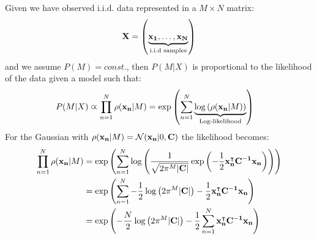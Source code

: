 Given we have observed i.i.d. data represented in a $M \times N$ matrix:
\begin{align}
	\mathbf{X} = \left( \underbrace{\mathbf{x_1}, \dots, \mathbf{x_N}}_{\text{i.i.d samples}} \right)
\end{align}
and we assume $P(M) = const.$, then $P(M|X)$ is proportional to the likelihood of the 
data given a model such that:
\begin{align}
	\begin{split}
	P(M|X) \varpropto \prod_{n=1}^N \rho(\mathbf{x_n}|M) 
	    &= \exp \left( \sum_{n=1}^N \underbrace{\log \left( \rho(\mathbf{x_n}|M) \right)}_{\text{Log-likelihood}} \right)
	\end{split}
\end{align}
\noindent For the Gaussian with $\rho(\mathbf{x_n}|M) = \mathcal{N}(\mathbf{x_n}|0,\mathbf{C})$ the likelihood becomes:
\begin{align}
	\begin{split}
	\prod_{n=1}^N \rho(\mathbf{x_n}|M) 
	        &= \exp \left( \sum_{n=1}^N \log \left( \frac{1}{\sqrt{2\pi^M |\mathbf{C}|}} \exp \left( -\frac{1}{2} \mathbf{x_n ^\intercal C^{-1} x_n} \right) \right) \right) \\
	        &= \exp \left( \sum_{n=1}^N -\frac{1}{2}\log \left( 2\pi^M |\mathbf{C}| \right) -\frac{1}{2} \mathbf{x_n ^\intercal C^{-1} x_n} \right) \\
	        &= \exp \left( -\frac{N}{2}\log \left( 2\pi^M |\mathbf{C}| \right) -\frac{1}{2} \sum_{n=1}^N \mathbf{x_n ^\intercal C^{-1} x_n} \right) \\
	\end{split}
\end{align}


